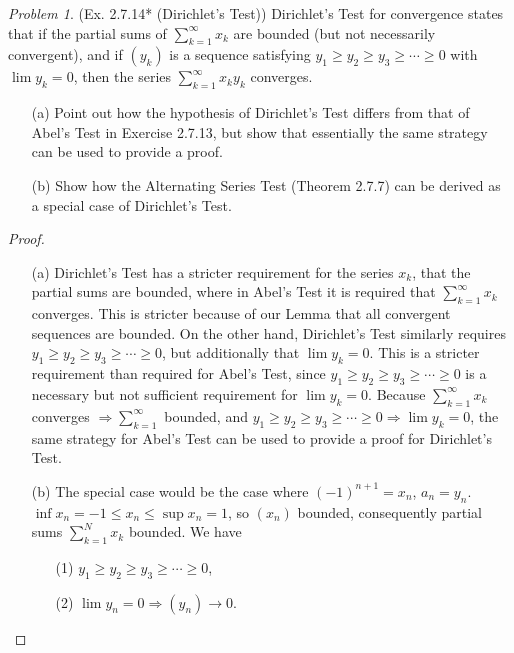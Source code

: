 \documentclass[11pt,twoside, reqno]{amsart}
\theoremstyle{remark}
\newtheorem{Prob}{Problem}
\renewcommand{\implies}{\Rightarrow}
\begin{document}
\begin{Prob}(Ex. 2.7.14* (Dirichlet's Test))  Dirichlet's Test for convergence states that if the partial sums of $\sum^\infty_{k=1}x_k$ are bounded (but not necessarily convergent), and if $(y_k)$ is a sequence satisfying $y_1 \geq y_2 \geq y_3 \geq \cdots \geq 0$ with $\lim y_k = 0$, then the series $\sum^\infty_{k=1} x_ky_k$ converges.
\begin{enumerate}
    \item [(a)] Point out how the hypothesis of Dirichlet's Test differs from that of Abel's Test in Exercise 2.7.13, but show that essentially the same strategy can be used to provide a proof.
    \item [(b)] Show how the Alternating Series Test (Theorem 2.7.7) can be derived as a special case of Dirichlet's Test.
\end{enumerate}
\end{Prob}

\begin{proof}
\begin{enumerate}
    \item [(a)] Dirichlet's Test has a stricter requirement for the series $x_k$, that the partial sums are bounded, where in Abel's Test it is required that $\sum^\infty_{k=1} x_k$ converges. This is stricter because of our Lemma that all convergent sequences are bounded. On the other hand, Dirichlet's Test similarly requires $y_1 \geq y_2 \geq y_3 \geq \cdots \geq 0$, but additionally that $\lim y_k = 0$. This is a stricter requirement than required for Abel's Test, since $y_1 \geq y_2 \geq y_3 \geq \cdots \geq 0$ is a necessary but not sufficient requirement for $\lim y_k = 0$. Because $\sum^\infty_{k=1} x_k$ converges $\implies \sum^\infty_{k=1}$ bounded, and $y_1 \geq y_2 \geq y_3 \geq \cdots \geq 0 \implies \lim y_k = 0$, the same strategy for Abel's Test can be used to provide a proof for Dirichlet's Test.
    \item [(b)] The special case would be the case where $(-1)^{n+1} = x_n$, $a_n = y_n$. $\inf x_n = -1 \leq x_n \leq \sup x_n = 1$, so $(x_n)$ bounded, consequently partial sums $\sum^N_{k=1} x_k$ bounded. We have
    \begin{enumerate}
        \item [(1)] $y_1 \geq y_2 \geq y_3 \geq \cdots \geq 0$,
        \item [(2)] $\lim y_n = 0 \implies (y_n) \to 0$. 
    \end{enumerate}
\end{enumerate}

\end{proof}
\end{document}
